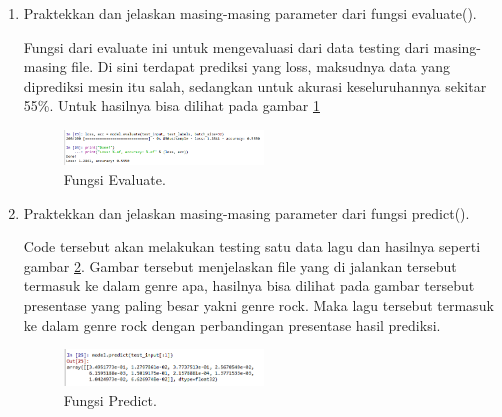 \begin{enumerate}
\item Praktekkan dan jelaskan masing-masing parameter dari fungsi evaluate(). \par

Fungsi dari evaluate ini untuk mengevaluasi dari data testing dari masing-masing file. Di sini terdapat prediksi yang loss, maksudnya data yang diprediksi mesin itu salah, sedangkan untuk akurasi keseluruhannya sekitar 55\%. Untuk hasilnya bisa dilihat pada gambar \ref{suara9}
		\begin{figure}[!htbp]
		\centerline{\includegraphics[width=0.5\textwidth]{figures/im/suara9.png}}
		\caption{Fungsi Evaluate.}
		\label{suara9}
		\end{figure}

\item Praktekkan dan jelaskan masing-masing parameter dari fungsi predict(). \par

Code tersebut akan melakukan testing satu data lagu dan hasilnya seperti gambar \ref{suara10}. Gambar tersebut menjelaskan file yang di jalankan tersebut termasuk ke dalam genre apa, hasilnya bisa dilihat pada gambar tersebut presentase yang paling besar yakni genre rock. Maka lagu tersebut termasuk ke dalam genre rock dengan perbandingan presentase hasil prediksi.
		\begin{figure}[!htbp]
		\centerline{\includegraphics[width=0.5\textwidth]{figures/im/suara10.png}}
		\caption{Fungsi Predict.}
		\label{suara10}
		\end{figure}
\end{enumerate}


